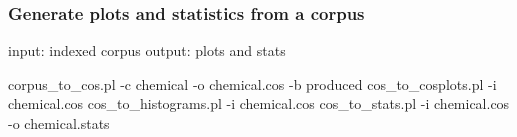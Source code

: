 \subsubsection{Generate plots and statistics from a corpus}

\begin{boxedverbatim}
 input: indexed corpus
 output: plots and stats

 corpus_to_cos.pl -c chemical -o chemical.cos -b produced
 cos_to_cosplots.pl -i chemical.cos
 cos_to_histograms.pl -i chemical.cos
 cos_to_stats.pl -i chemical.cos -o chemical.stats
\end{boxedverbatim}
